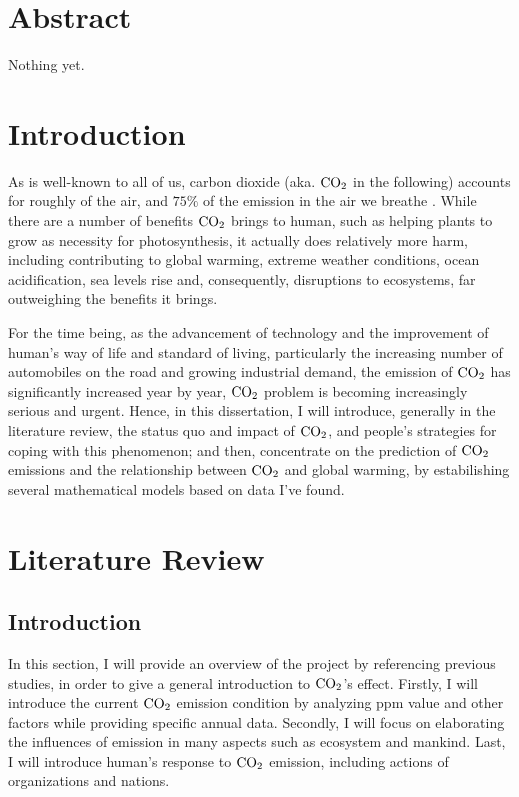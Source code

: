 \documentclass[12pt,a4paper]{article}
\begin{document}
    \maketitle
    \newpage
    \tableofcontents    
    \newpage
    \setlength{\parskip}{1em}   
    
    \section{Abstract}
    Nothing yet.
    \section{Introduction}
    As is well-known to all of us, carbon dioxide (aka. $\ce{CO2}$ in the following) accounts for roughly \label{data} of the air, and $75\%$ of the emission in the air we breathe \label{cite}. While there are a number of benefits $\ce{CO2}$ brings to human, such as helping plants to grow as necessity for photosynthesis, it actually does relatively more harm, including contributing to global warming, extreme weather conditions, ocean acidification, sea levels rise and, consequently, disruptions to ecosystems, far outweighing the benefits it brings.

    For the time being, as the advancement of technology and the improvement of human's way of life and standard of living, particularly the increasing number of automobiles on the road and growing industrial demand, the emission of $\ce{CO2}$ has significantly increased year by year, 
    $\ce{CO2}$ problem is becoming increasingly serious and urgent. Hence, in this dissertation, I will introduce, generally in the literature review, the status quo and impact of $\ce{CO2}$, and people's strategies for coping with this phenomenon; and then, concentrate on the prediction of $\ce{CO2}$ emissions and the relationship between $\ce{CO2}$ and global warming, by estabilishing several mathematical models based on data I've found.
        
    \section{Literature Review}
    \subsection{Introduction}
    In this section, I will provide an overview of the project by referencing previous studies, in order to give a general introduction to $\ce{CO2}$'s effect. Firstly, I will introduce the current $\ce{CO2}$ emission condition by analyzing ppm value and other factors while providing specific annual data. Secondly, I will focus on elaborating the influences of  emission in many aspects such as ecosystem and mankind. Last, I will introduce human's response to  $\ce{CO2}$ emission, including actions of organizations and nations.
    
\end{document}
